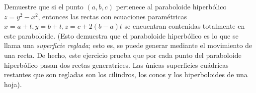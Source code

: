 \item Demuestre que si el punto $(a, b, c)$ pertenece al paraboloide hiperbólico $z = y^2 - x^2$, entonces las rectas con ecuaciones paramétricas $x = a + t, y = b + t, z = c + 2(b - a)t$ se encuentran contenidas totalmente en este paraboloide. (Esto demuestra que el paraboloide hiperbólico es lo que se llama una \textit{superficie reglada}; esto es, se puede generar mediante el movimiento de una recta. De hecho, este ejercicio prueba que por cada punto del paraboloide hiperbólico pasan dos rectas generatrices. Las únicas superficies cuádricas restantes que son regladas son los cilindros, los conos y los hiperboloides de una hoja).
